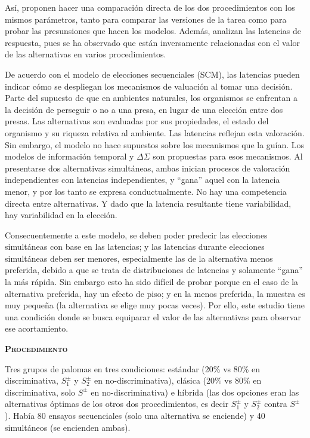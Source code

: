 \documentclass[a4paper,12pt]{article}
\begin{document}
Así, proponen hacer una comparación directa de los dos procedimientos con los mismos parámetros, tanto para comparar las versiones de la tarea como para probar las presunsiones que hacen los modelos. Además, analizan las latencias de respuesta, pues se ha observado que están inversamente relacionadas con el valor de las alternativas en varios procedimientos.

De acuerdo con el modelo de elecciones secuenciales (SCM), las latencias pueden indicar cómo se despliegan los mecanismos de valuación al tomar una decisión. Parte del supuesto de que en ambientes naturales, los organismos se enfrentan a la decisión de perseguir o no a una presa, en lugar de una elección entre dos presas. Las alternativas son evaluadas por sus propiedades, el estado del organismo y su riqueza relativa al ambiente. Las latencias reflejan esta valoración. Sin embargo, el modelo no hace supuestos sobre los mecanismos que la guían. Los modelos de información temporal y $\Delta\Sigma$ son propuestas para esos mecanismos. Al presentarse dos alternativas simultáneas, ambas inician procesos de valoración independientes con latencias independientes, y ``gana'' aquel con la latencia menor, y por los tanto se expresa conductualmente. No hay una competencia directa entre alternativas. Y dado que la latencia resultante tiene variabilidad, hay variabilidad en la elección.

Consecuentemente a este modelo, se deben poder predecir las elecciones simultáneas con base en las latencias; y las latencias durante elecciones simultáneas deben ser menores, especialmente las de la alternativa menos preferida, debido a que se trata de distribuciones de latencias y solamente ``gana'' la más rápida. Sin embargo esto ha sido difícil de probar porque en el caso de la alternativa preferida, hay un efecto de piso; y en la menos preferida, la muestra es muy pequeña (la alternativa se elige muy pocas veces). Por ello, este estudio tiene una condición donde se busca equiparar el valor de las alternativas para observar ese acortamiento.

{\scshape\bfseries Procedimiento}

Tres grupos de palomas en tres condiciones: estándar (20\% vs 80\% en discriminativa, $S^\pm_1$ y $S^\pm_2$ en no-discriminativa), clásica (20\% vs 80\% en discriminativa, solo $S^\pm$ en no-discriminativa) e híbrida (las dos opciones eran las alternativas óptimas de los otros dos procedimientos, es decir $S^\pm_1$ y $S^\pm_2$ contra $S^\pm$). Había 80 ensayos secuenciales (solo una alternativa se enciende) y 40 simultáneos (se encienden ambas).
\end{document}
